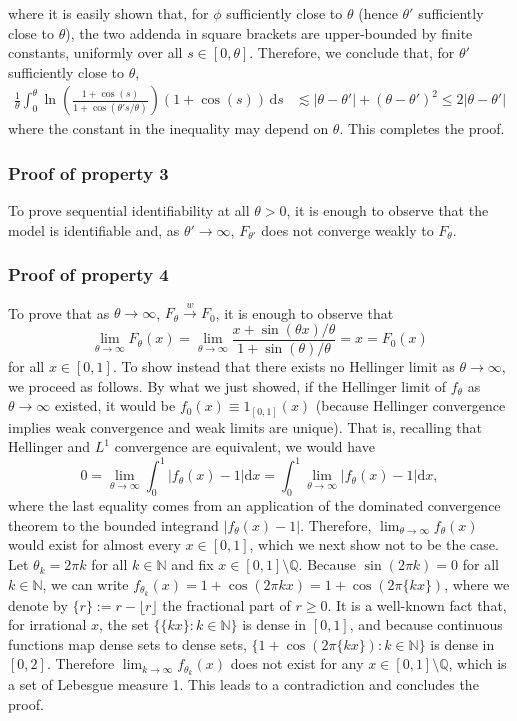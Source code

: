 \documentclass[11pt,twoside]{article}
\newcommand{\wc}{\overset{w}{\longrightarrow}}
\def\NN{\mathbb{N}}
\def\QQ{\mathbb{Q}}
\begin{document}
%
where it is easily shown that, for $\phi$ sufficiently close to $\theta$ (hence $\theta'$ sufficiently close to $\theta$), the two addenda in square brackets are upper-bounded by finite constants, uniformly over all $s\in[0,\theta]$. Therefore, we conclude that, for $\theta'$ sufficiently close to $\theta$,
%
\begin{align*}
    \frac{1}{\theta} \int_0^\theta \ln\left(\frac{1+\cos(s)}{1+\cos(\theta's/\theta)}\right)(1+\cos(s))\,\mathrm ds & \lesssim |\theta - \theta'| + (\theta - \theta')^2 \leq 2|\theta - \theta'|
\end{align*}
%
where the constant in the inequality may depend on $\theta$. This completes the proof.







\subsubsection*{Proof of property 3}
To prove sequential identifiability at all $\theta>0$, it is enough to observe that the model is identifiable and, as $\theta'\to\infty$, $F_{\theta'}$ does not converge weakly to $F_\theta$.


\subsubsection*{Proof of property 4}
To prove that as $\theta\to\infty$, $F_{\theta}\wc F_0$, it is enough to observe that
%
$$\lim_{\theta\to\infty} F_{\theta}(x) = \lim_{\theta\to\infty}\frac{x + \sin(\theta x)/\theta}{1 + \sin(\theta)/\theta} = x = F_0(x)$$
%
for all $x\in[0,1]$. To show instead that there exists no Hellinger limit as $\theta\to\infty$, we proceed as follows. By what we just showed, if the Hellinger limit of $f_\theta$ as $\theta\to\infty$ existed, it would be $f_0(x)\equiv 1_{[0,1]}(x)$ (because Hellinger convergence implies weak convergence and weak limits are unique). That is, recalling that Hellinger and $L^1$ convergence are equivalent, we would have
%
\begin{equation*}
    0 = \lim_{\theta\to\infty} \int_0^1 |f_\theta(x) - 1| \mathrm dx = \int_0^1 \lim_{\theta\to\infty}|f_\theta(x) - 1| \mathrm dx,
\end{equation*}
%
where the last equality comes from an application of the dominated convergence theorem to the bounded integrand $|f_\theta(x) - 1|$. Therefore, $\lim_{\theta\to\infty} f_\theta(x)$ would exist for almost every $x\in[0,1]$, which we next show not to be the case. Let $\theta_k=2\pi k$ for all $k\in\NN$ and fix $x\in[0,1]\setminus\QQ$. Because $\sin(2\pi k) = 0$ for all $k\in\NN$, we can write $f_{\theta_k}(x) = 1+\cos(2\pi k x) = 1 +\cos(2\pi \{kx\})$, where we denote by $\{r\}:= r - \lfloor r\rfloor$ the fractional part of $r\geq 0$. It is a well-known fact that, for irrational $x$, the set $\{\{kx\} : k\in\NN\}$ is dense in $[0,1]$, and because continuous functions map dense sets to dense sets, $\{1 + \cos(2\pi\{kx\}) : k\in\NN\}$ is dense in $[0,2]$. Therefore $\lim_{k\to\infty} f_{\theta_k}(x)$ does not exist for any $x\in [0,1]\setminus \QQ$, which is a set of Lebesgue measure 1. This leads to a contradiction and concludes the proof.
\end{document}
